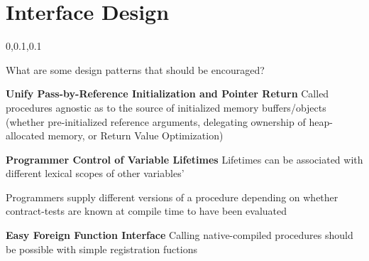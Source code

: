 
\section{Interface Design}\fbeg{}\begin{frame}{}


\vspace{-.5em}	

{\Large{}\selectfont
\hspace*{2pt}\begin{minipage}{.96\textwidth}
\vspace{4pt}


		
\begin{lightquadblockc}{0,0.1,0.1}{\parbox{21cm}{\centering \vspace{10pt}What are some design patterns that should be encouraged?\vspace{3pt}}}
\begin{center}\begin{minipage}{1.03\textwidth}
{\LARGE \setlength{\leftmargini}{30pt}\begin{enumerate}
\dmitem \textbf{Unify Pass-by-Reference Initialization and Pointer Return} \hspace{.5em} Called procedures 
agnostic as to the source of initialized memory buffers/objects (whether 
pre-initialized reference arguments, delegating ownership of heap-allocated memory, or Return Value Optimization) 

{\vsp}

\dmitem \textbf{Programmer Control of Variable Lifetimes}  \hspace{.5em} Lifetimes 
can be associated with different lexical scopes of other variables'

{\vsp}

\dmitem \textbf{}  \hspace{.5em}  Programmers supply 
different versions of a procedure depending on whether contract-tests 
are known at compile time to have been evaluated 

{\vsp}

\dmitem \textbf{Easy Foreign Function Interface}  \hspace{.5em} Calling 
native-compiled procedures should be possible with simple registration fuctions


\end{enumerate}}
\end{minipage}
\end{center}
\end{lightquadblockc}
\end{minipage}}
\end{frame}

